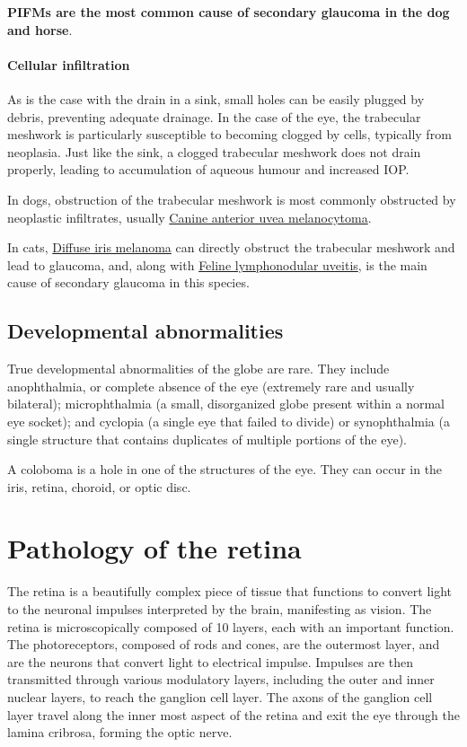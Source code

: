 \documentclass[openany]{book}
\begin{document}
\textbf{PIFMs are the most common cause of secondary glaucoma in the dog
and horse}.

\subsubsection{Cellular infiltration}\label{cellular-infiltration}

As is the case with the drain in a sink, small holes can be easily
plugged by debris, preventing adequate drainage. In the case of the eye,
the trabecular meshwork is particularly susceptible to becoming clogged
by cells, typically from neoplasia. Just like the sink, a clogged
trabecular meshwork does not drain properly, leading to accumulation of
aqueous humour and increased IOP.

In dogs, obstruction of the trabecular meshwork is most commonly
obstructed by neoplastic infiltrates, usually
\protect\hyperlink{canine-anterior-uvea-melanocytoma}{Canine anterior
uvea melanocytoma}.

In cats, \protect\hyperlink{diffuse-iris-melanoma}{Diffuse iris
melanoma} can directly obstruct the trabecular meshwork and lead to
glaucoma, and, along with
\protect\hyperlink{feline-lymphonodular-uveitis}{Feline lymphonodular
uveitis}, is the main cause of secondary glaucoma in this species.

\section{Developmental abnormalities}\label{developmental-abnormalities}

True developmental abnormalities of the globe are rare. They include
anophthalmia, or complete absence of the eye (extremely rare and usually
bilateral); microphthalmia (a small, disorganized globe present within a
normal eye socket); and cyclopia (a single eye that failed to divide) or
synophthalmia (a single structure that contains duplicates of multiple
portions of the eye).

A coloboma is a hole in one of the structures of the eye. They can occur
in the iris, retina, choroid, or optic disc.

\hypertarget{pathology-of-the-retina}{\chapter{Pathology of the
retina}\label{pathology-of-the-retina}}

The retina is a beautifully complex piece of tissue that functions to
convert light to the neuronal impulses interpreted by the brain,
manifesting as vision. The retina is microscopically composed of 10
layers, each with an important function. The photoreceptors, composed of
rods and cones, are the outermost layer, and are the neurons that
convert light to electrical impulse. Impulses are then transmitted
through various modulatory layers, including the outer and inner nuclear
layers, to reach the ganglion cell layer. The axons of the ganglion cell
layer travel along the inner most aspect of the retina and exit the eye
through the lamina cribrosa, forming the optic nerve.
\end{document}

